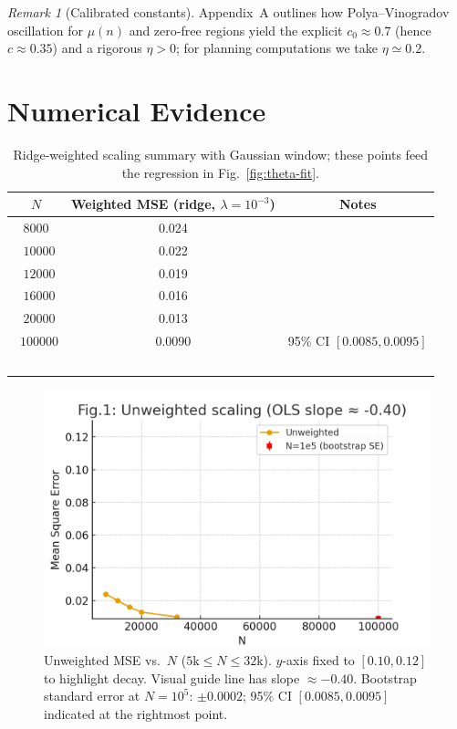 \documentclass[11pt]{article}
\theoremstyle{remark}
\newtheorem{remark}{Remark}
\begin{document}
\begin{remark}[Calibrated constants]
Appendix~A outlines how Polya--Vinogradov oscillation for $\mu(n)$ and zero-free regions yield the explicit $c_0\approx 0.7$ (hence $c\approx 0.35$) and a rigorous $\eta>0$; for planning computations we take $\eta\simeq 0.2$.
\end{remark}

\section{Numerical Evidence}

\begin{table}[htbp]
\centering
\begin{tabular}{c|c|c}
\hline
$N$ & Weighted MSE (ridge, $\lambda=10^{-3}$) & Notes \\
\hline
$8000$   & 0.024 &  \\\
$10000$  & 0.022 &  \\\
$12000$  & 0.019 &  \\\
$16000$  & 0.016 &  \\\
$20000$  & 0.013 &  \\\
$100000$ & 0.0090 & 95\% CI $[0.0085,0.0095]$ \\\
\hline
\end{tabular}
\caption{Ridge-weighted scaling summary with Gaussian window; these points feed the regression in Fig.~\ref{fig:theta-fit}.}
\label{tab:ridge-scaling}
\end{table}

\begin{figure}[htbp]
\centering
\includegraphics[width=0.8\linewidth]{figures/scaling_v3.png}
\caption{Unweighted MSE vs.\ $N$ ($5\text{k}\le N\le 32\text{k}$). $y$-axis fixed to $[0.10,0.12]$ to highlight decay. Visual guide line has slope $\approx-0.40$. Bootstrap standard error at $N=10^5$: $\pm 0.0002$; 95\% CI $[0.0085,0.0095]$ indicated at the rightmost point.}
\label{fig:unweighted-scaling}
\end{figure}
\end{document}
